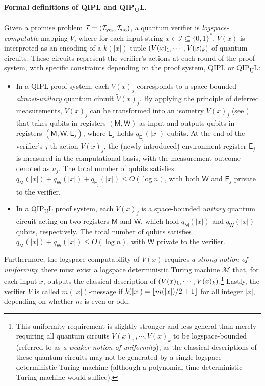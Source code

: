 \documentclass[11pt, a4paper]{article}
\numberwithin{equation}{section}
\numberwithin{figure}{section}
\newcommand{\QIPL}{\textnormal{\textsf{QIPL}}\xspace}
\newcommand{\QIPUL}{\texorpdfstring{\textnormal{\textsf{QIP}\textsubscript{\textnormal{U}}\textsf{L}}}\xspace}
\DeclarePairedDelimiter\rbra{\lparen}{\rparen}
\DeclarePairedDelimiter\floor{\lfloor}{\rfloor}
\newcommand{\yes}{{\rm yes}}
\newcommand{\no}{{\rm no}}
\newcommand{\binset}{\{0,1\}}
\newcommand{\calI}{\mathcal{I}}
\newcommand{\calM}{\mathcal{M}}
\newcommand{\sfE}{\mathsf{E}}
\newcommand{\sfM}{\mathsf{M}}
\newcommand{\sfW}{\mathsf{W}}
\begin{document}
\paragraph{Formal definitions of \QIPL{} and \QIPUL{}.} Given a promise problem $\calI = (\calI_{\yes}, \calI_{\no})$, a quantum verifier is \textit{logspace-computable} mapping $V$, where for each input string $x \in \calI \subseteq \binset^*$, $V(x)$ is interpreted as an encoding of a $k(|x|)$-tuple $\rbra*{V(x)_1,\cdots,V(x)_k}$ of quantum circuits. These circuits represent the verifier's actions at each round of the proof system, with specific constraints depending on the proof system, \QIPL{} or \QIPUL{}: 
\begin{itemize}[leftmargin=2em, topsep=0.33em, itemsep=0.33em, parsep=0.33em]
    \item In a \QIPL{} proof system, each $V(x)_j$ corresponds to a space-bounded \textit{almost-unitary} quantum circuit $\widetilde{V}(x)_j$. By applying the principle of deferred measurements, $\widetilde{V}(x)_j$ can be transformed into an isometry $V(x)_j$ (see ) that takes qubits in registers $(\sfM,\sfW)$ as input and outputs qubits in registers $(\sfM,\sfW,\sfE_j)$, where $\sfE_j$ holds $q_{\sfE_j}(|x|)$ qubits.
    At the end of the verifier's $j$-th action $V(x)_j$, the (newly introduced) environment register $\sfE_j$ is measured in the computational basis, with the measurement outcome denoted as $u_j$. 
    The total number of qubits satisfies $q_{\sfM}(|x|) + q_{\sfW}(|x|) + q_{\sfE_j}(|x|) \leq O(\log n)$, with both $\sfW$ and $\sfE_j$ private to the verifier. 
    \item In a \QIPUL{} proof system, each $V(x)_j$ is a space-bounded \textit{unitary} quantum circuit acting on two registers $\sfM$ and $\sfW$, which hold $q_{\sfM}(|x|)$ and $q_{\sfW}(|x|)$ qubits, respectively. The total number of qubits satisfies $q_{\sfM}(|x|) + q_{\sfW}(|x|) \leq O(\log n)$, with $\sfW$ private to the verifier. 
\end{itemize}

Furthermore, the logspace-computability of $V(x)$ requires \textit{a strong notion of uniformity}: there must exist a logspace deterministic Turing machine $\calM$ that, for each input $x$, outputs the classical description of $\rbra{V(x)_1,\cdots,V(x)_k}$.\footnote{This uniformity requirement is slightly stronger and less general than merely requiring all quantum circuits $V(x)_1,\cdots,V(x)_k$ to be logspace-bounded (referred to as \textit{a weaker notion of uniformity}), as the classical descriptions of these quantum circuits may not be generated by a single logspace deterministic Turing machine (although a polynomial-time deterministic Turing machine would suffice).\label{footref:logspace-uniformity}} 
Lastly, the verifier $V$ is called $m(|x|)$-message if $k(|x|) = \floor{m(|x|)/2+1}$ for all integer $|x|$, depending on whether $m$ is even or odd. 
\end{document}
